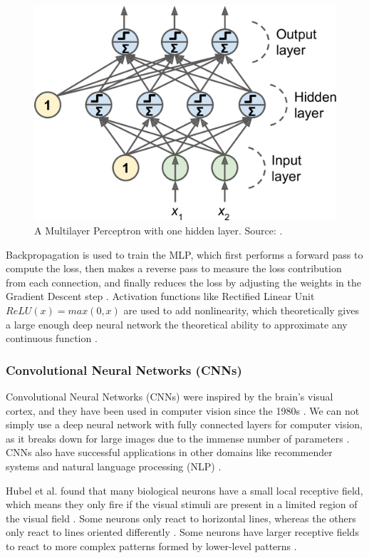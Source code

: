 \documentclass[a4paper, 11pt, oneside]{article}
\begin{document}
\begin{figure}[ht]
  \begin{center}
    \includegraphics[width=.5\textwidth]{mlp.png}
  \end{center}
  \caption{A Multilayer Perceptron with one hidden layer. Source: \cite{geron2019hands}.}
\end{figure}

Backpropagation \cite{rumelhart1985learning} is used to train the MLP, which first performs a forward pass to compute
the loss, then makes a reverse pass to measure the loss contribution from each connection, and finally reduces the
loss by adjusting the weights in the Gradient Descent \cite{ruder2016overview} step \cite{geron2019hands}. Activation
functions like Rectified Linear Unit $ReLU(x) = max(0, x)$ are used to add nonlinearity, which theoretically gives a
large enough deep neural network the theoretical ability to approximate any continuous function \cite{geron2019hands}.

\subsubsection{Convolutional Neural Networks (CNNs)}

\label{sec:cnn}

Convolutional Neural Networks (CNNs) \cite{lecun1989backpropagation} were inspired by the brain's visual cortex,
and they have been used in computer vision since the 1980s \cite{geron2019hands}. We can not simply use a deep neural
network with fully connected layers for computer vision, as it breaks down for large images due to the immense
number of parameters \cite{geron2019hands}. CNNs also have successful applications in other domains like recommender
systems \cite{van2013deep} and natural language processing (NLP) \cite{collobert2008unified}.

Hubel et al. \cite{hubel1959single, hubel1959receptive, hubel1968receptive} found that many biological neurons have
a small local receptive field, which means they only fire if the visual stimuli are present in a limited region of
the visual field \cite{geron2019hands}. Some neurons only react to horizontal lines, whereas the others only react to
lines oriented differently \cite{geron2019hands}. Some neurons have larger receptive fields to react to more complex
patterns formed by lower-level patterns \cite{geron2019hands}.
\end{document}
